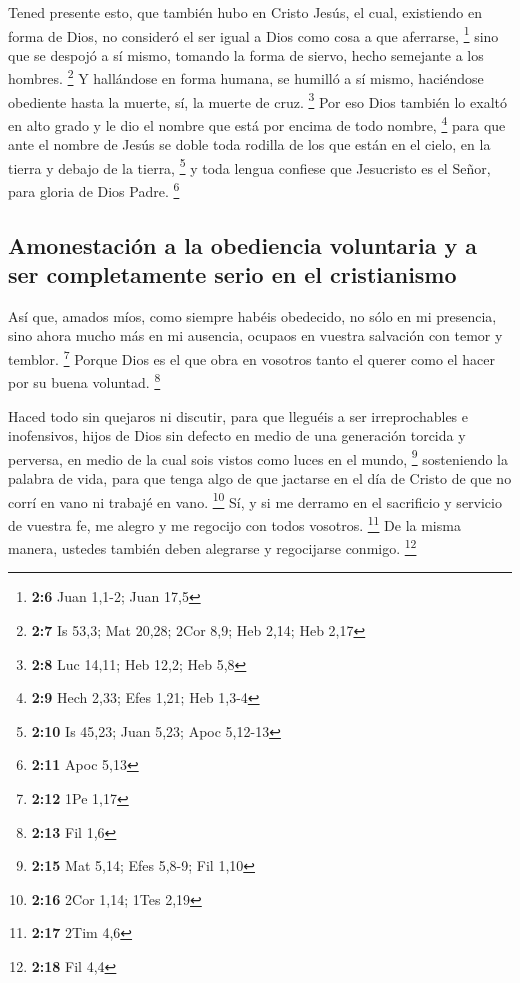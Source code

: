  Tened presente esto, que también hubo en Cristo Jesús,
 el cual, existiendo en forma de Dios, no consideró el ser
igual a Dios como cosa a que aferrarse, \footnote{\textbf{2:6} Juan
  1,1-2; Juan 17,5}  sino que se despojó a sí mismo,
tomando la forma de siervo, hecho semejante a los hombres. \footnote{\textbf{2:7}
  Is 53,3; Mat 20,28; 2Cor 8,9; Heb 2,14; Heb 2,17}  Y
hallándose en forma humana, se humilló a sí mismo, haciéndose obediente
hasta la muerte, sí, la muerte de cruz. \footnote{\textbf{2:8} Luc
  14,11; Heb 12,2; Heb 5,8}  Por eso Dios también lo
exaltó en alto grado y le dio el nombre que está por encima de todo
nombre, \footnote{\textbf{2:9} Hech 2,33; Efes 1,21; Heb 1,3-4}
 para que ante el nombre de Jesús se doble toda rodilla
de los que están en el cielo, en la tierra y debajo de la tierra,
\footnote{\textbf{2:10} Is 45,23; Juan 5,23; Apoc 5,12-13}
 y toda lengua confiese que Jesucristo es el Señor, para
gloria de Dios Padre. \footnote{\textbf{2:11} Apoc 5,13}

\hypertarget{amonestaciuxf3n-a-la-obediencia-voluntaria-y-a-ser-completamente-serio-en-el-cristianismo}{%
\subsection{Amonestación a la obediencia voluntaria y a ser
completamente serio en el
cristianismo}\label{amonestaciuxf3n-a-la-obediencia-voluntaria-y-a-ser-completamente-serio-en-el-cristianismo}}

 Así que, amados míos, como siempre habéis obedecido, no
sólo en mi presencia, sino ahora mucho más en mi ausencia, ocupaos en
vuestra salvación con temor y temblor. \footnote{\textbf{2:12} 1Pe 1,17}
 Porque Dios es el que obra en vosotros tanto el querer
como el hacer por su buena voluntad. \footnote{\textbf{2:13} Fil 1,6}

 Haced todo sin quejaros ni discutir, 
para que lleguéis a ser irreprochables e inofensivos, hijos de Dios sin
defecto en medio de una generación torcida y perversa, en medio de la
cual sois vistos como luces en el mundo, \footnote{\textbf{2:15} Mat
  5,14; Efes 5,8-9; Fil 1,10}  sosteniendo la palabra de
vida, para que tenga algo de que jactarse en el día de Cristo de que no
corrí en vano ni trabajé en vano. \footnote{\textbf{2:16} 2Cor 1,14;
  1Tes 2,19}  Sí, y si me derramo en el sacrificio y
servicio de vuestra fe, me alegro y me regocijo con todos vosotros.
\footnote{\textbf{2:17} 2Tim 4,6}  De la misma manera,
ustedes también deben alegrarse y regocijarse conmigo. \footnote{\textbf{2:18}
  Fil 4,4}

